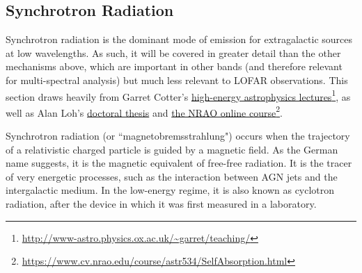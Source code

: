 \subsection{Synchrotron Radiation}

\pg
Synchrotron radiation is the dominant mode of emission for extragalactic sources at low wavelengths. As such, it will be covered in greater detail than the other mechanisms above, which are important in other bands (and therefore relevant for multi-spectral analysis) but much less relevant to LOFAR observations. This section draws heavily from Garret Cotter's \href{http://www-astro.physics.ox.ac.uk/~garret/teaching/}{high-energy astrophysics lectures}\footnote{\url{http://www-astro.physics.ox.ac.uk/~garret/teaching/}}, as well as Alan Loh's \href{http://theses.md.univ-paris-diderot.fr/LOH_Alan_2_va_20160930.pdf}{doctoral thesis}  and \href{https://www.cv.nrao.edu/course/astr534/SelfAbsorption.html}{the NRAO online course}\footnote{\url{https://www.cv.nrao.edu/course/astr534/SelfAbsorption.html}}.

\pg
Synchrotron radiation (or ``magnetobremsstrahlung") occurs when the trajectory of a relativistic charged particle is guided by a magnetic field. As the German name suggests, it is the magnetic equivalent of free-free radiation. It is the tracer of very energetic processes, such as the interaction between AGN jets and the intergalactic medium. In the low-energy regime, it is also known as cyclotron radiation, after the device in which it was first measured in a laboratory. %

